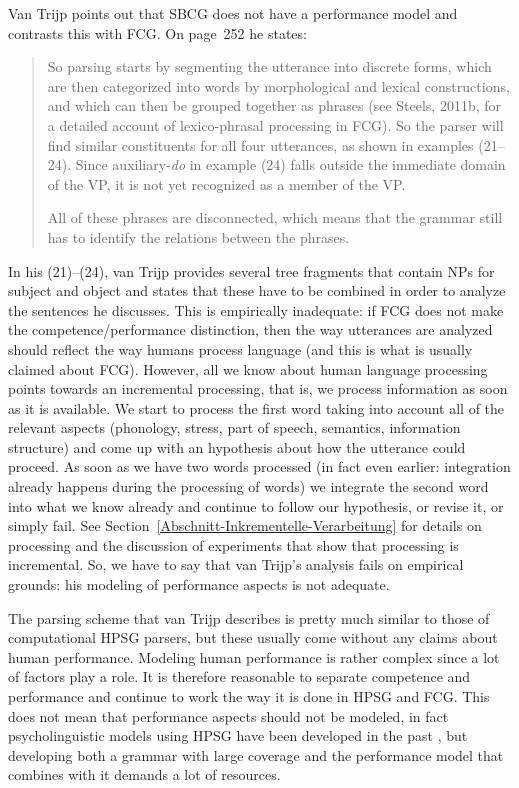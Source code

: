 Van Trijp points out that SBCG does not have a performance model and contrasts this with FCG. On
page~252 he states:
\begin{quote}
So parsing starts by segmenting the utterance
into discrete forms, which are then categorized into words by morphological
and lexical constructions, and which can then be grouped together as
phrases (see Steels, 2011b, for a detailed account of lexico-phrasal
processing in FCG). So the parser will find similar constituents for all
four utterances, as shown in examples (21--24). Since auxiliary-\emph{do} in
example (24) falls outside the immediate domain of the VP, it is not yet
recognized as a member of the VP.

All of these phrases are disconnected, which means that the grammar
still has to identify the relations between the phrases. \citep[]{vanTrijp2014a}
\end{quote}
In his (21)--(24), van Trijp provides several tree fragments that contain NPs for subject and object and states that
these have to be combined in order to analyze the sentences he discusses. This is empirically
inadequate: if FCG does not make the competence/performance distinction, then the way utterances are
analyzed should reflect the way humans process language (and this is what is usually claimed about FCG). However, all we know about human language
processing points towards an incremental processing, that is, we process information as soon as it
is available. We start to process the first word taking into account all of the relevant aspects
(phonology, stress, part of speech, semantics, information structure) and come up with an hypothesis
about how the utterance could proceed. As soon as we have two
words processed (in fact even earlier: integration already happens during the processing of words) we integrate the second word
into what we know already and continue to follow our hypothesis, or revise it, or simply fail. See
Section~\ref{Abschnitt-Inkrementelle-Verarbeitung} for details on processing and the discussion of
experiments that show that processing is incremental. So, we have to say that van Trijp's analysis
fails on empirical grounds: his modeling of performance aspects is not adequate.

The parsing scheme that van Trijp describes is pretty much similar to those of computational HPSG parsers, but
these usually come without any claims about human performance. Modeling human performance is rather complex
since a lot of factors play a role. It is therefore reasonable to separate competence and
performance and continue to work the way it is done in HPSG and FCG. This does not mean that
performance aspects should not be modeled, in fact psycholinguistic models using HPSG have been
developed in the past \citep{Konieczny96a-u}, but developing both a grammar with large coverage and
the performance model that combines with it demands a lot of resources.

